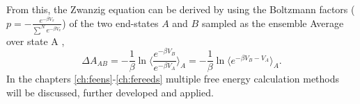 From this, the Zwanzig equation\cite{Zwanzig1954} can be derived by using the Boltzmann factors ($p=-\frac{e^{-\beta V_x}}{\sum^N e^{-\beta V_x}}$) of the two end-states $A$ and $B$ sampled as the ensemble Average over state A \cite{Zwanzig1954}, 
\begin{equation}
        \Delta A_{AB} 
        = -\frac{1}{\beta} \ln\langle \frac{e^{-\beta V_B}}{e^{-\beta V_A}}\rangle_A
        = -\frac{1}{\beta} \ln\langle e^{-\beta V_B-V_A}\rangle_A .
\end{equation}
In the chapters \ref{ch:feens}-\ref{ch:fereeds} multiple free energy calculation methods will be discussed, further developed and applied. 